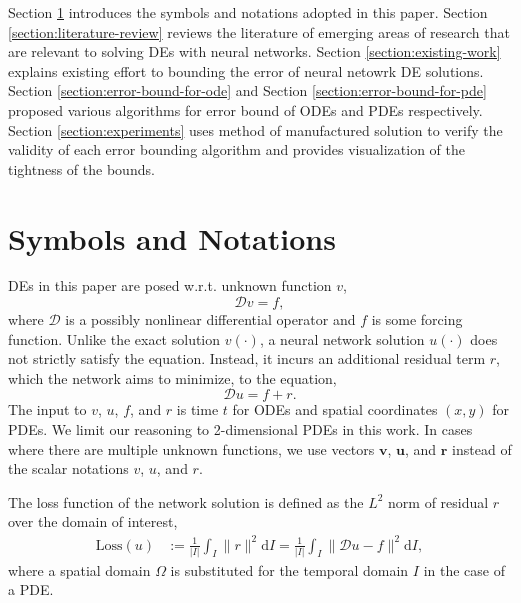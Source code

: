 \documentclass[accepted]{uai2023}
\newcommand{\vect}[1]{\mathbf{#1}}
\newcommand{\Loss}{\mathrm{Loss}}
\begin{document}
    Section \ref{section:symbols-and-notations} introduces the symbols and notations adopted in this paper.
    Section \ref{section:literature-review} reviews the literature of emerging areas of research that are relevant to solving DEs with neural networks.
    Section \ref{section:existing-work} explains existing effort to bounding the error of neural netowrk DE solutions.
    Section \ref{section:error-bound-for-ode} and Section \ref{section:error-bound-for-pde} proposed various algorithms for error bound of ODEs and PDEs respectively.
    Section \ref{section:experiments} uses method of manufactured solution to verify the validity of each error bounding algorithm and provides visualization of the tightness of the bounds.

\section{Symbols and Notations} \label{section:symbols-and-notations}
    DEs in this paper are posed w.r.t. unknown function $v$,
    {
        \small
        \begin{equation*}
            \mathcal{D} v = f,
        \end{equation*}
    }
    where $\mathcal{D}$ is a possibly nonlinear differential operator and $f$ is some forcing function.
    Unlike the exact solution $v(\cdot)$, a neural network solution $u(\cdot)$ does not strictly satisfy the equation.
    Instead, it incurs an additional residual term $r$, which the network aims to minimize, to the equation, 
    {
        \small
        \begin{equation*}
            \mathcal{D} u = f + r.
        \end{equation*}
    }
    The input to $v$, $u$, $f$, and $r$ is time $t$ for ODEs and spatial coordinates $(x, y)$ for PDEs.
    We limit our reasoning to 2-dimensional PDEs in this work.
    In cases where there are multiple unknown functions, we use vectors $\vect{v}$, $\vect{u}$, and $\vect{r}$ instead of the scalar notations $v$, $u$, and $r$.

    The loss function of the network solution is defined as the $L^2$ norm of residual $r$ over the domain of interest,
    {
        \small
        \begin{align}
            \Loss{}(u) &:= \frac{1}{|I|} \int_{I} \|r\|^2 \mathrm{d}I = \frac{1}{|I|} \int_{I} \|\mathcal{D} u - f\|^2 \mathrm{d}I,
        \end{align}
    }
    where a spatial domain $\Omega$ is substituted for the temporal domain $I$ in the case of a PDE.
\end{document}
